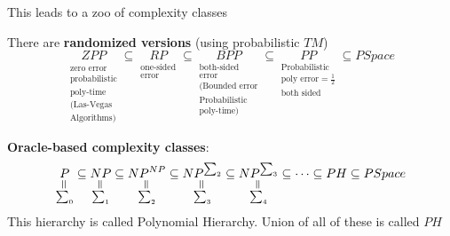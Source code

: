 \documentclass{report}
\begin{document}
{This leads to a zoo of complexity classes

There are \textbf{randomized versions} (using probabilistic $TM$)
$$\underset{ \substack{ \\ \text{zero error}\\ \text{probabilistic}\\ \text{poly-time}\\ \text{(Las-Vegas}\\ \text{Algorithms)}  } }{ZPP}\subseteq \underset{\substack{ \text{one-sided}\\\text{error} }}{RP} \subseteq \underset{ \substack{ \text{both-sided}\\\text{error}\\ \text{(Bounded error}\\ \text{Probabilistic} \\\text{poly-time)} } }{BPP} \subseteq \underset{\substack{ \text{Probabilistic}\\ \text{poly error}=\frac12\\ \text{both sided} }}{PP} \subseteq PSpace$$

\textbf{Oracle-based complexity classes}:
$$ \underset{ \substack{\ueq \\ \sum_0} }{P} \subseteq \underset{ \substack{\ueq \\ \sum_1} }{NP} \subseteq \underset{ \substack{\ueq \\ \sum_2} }{NP^{NP}} \subseteq \underset{ \substack{\ueq \\ \sum_3} }{NP^{\sum_2}}\subseteq \underset{ \substack{\ueq \\ \sum_4} }{NP^{\sum_3}} \subseteq \cdots\subseteq PH \subseteq PSpace$$This hierarchy is called Polynomial Hierarchy. Union of all of these is called $PH$

}
\end{document}
